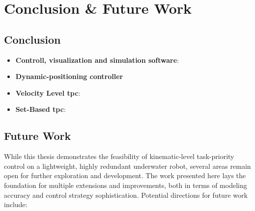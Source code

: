 \chapter{Conclusion \& Future Work}
\label{ch:conclusion}

\section{Conclusion}

\begin{itemize}
    \item \textbf{Controll, visualization and simulation software}:
    \item \textbf{Dynamic-positioning controller}
    \item \textbf{Velocity Level \gls{tpc}}:
    \item \textbf{Set-Based \gls{tpc}}:
\end{itemize}

\section{Future Work}
\label{sec:conclusion:future_work}

While this thesis demonstrates the feasibility of kinematic-level task-priority control on a lightweight, highly redundant underwater robot, several areas remain open for further exploration and development. The work presented here lays the foundation for multiple extensions and improvements, both in terms of modeling accuracy and control strategy sophistication. Potential directions for future work include:

